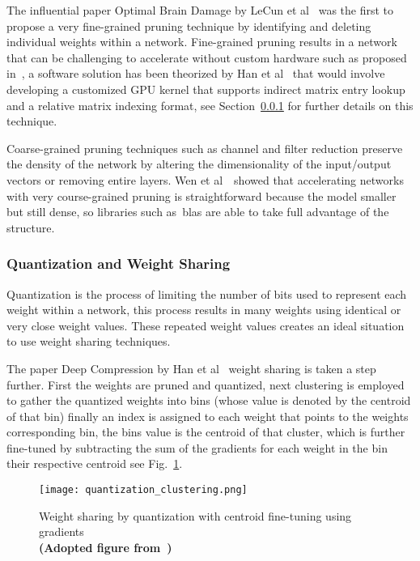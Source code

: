 \documentclass[../../D1.tex]{subfiles}
\begin{document}
The influential paper Optimal Brain Damage by LeCun et al~\autocite{lecunOptimalBrainDamage} was the first to propose a very fine-grained pruning technique by identifying and deleting individual weights within a network.
Fine-grained pruning results in a network that can be challenging to accelerate without custom hardware such as proposed in~\autocite{hanEIEEfficientInference2016,parasharSCNNAcceleratorCompressedsparse2017}, a software solution has been theorized by Han et al~\autocite{hanDeepCompressionCompressing2016} that would involve developing a customized GPU kernel that supports indirect matrix entry lookup and a relative matrix indexing format, see Section~\ref{sec:Quantization} for further details on this technique.


Coarse-grained pruning techniques such as channel and filter reduction preserve the density of the network by altering the dimensionality of the input/output vectors or removing entire layers. 
Wen et al~\autocite{wenLearningStructuredSparsity2016}~showed that accelerating networks with very course-grained pruning is straightforward because the model smaller but still dense, so libraries such as~\acrshort{blas} are able to take full advantage of the structure. 




\subsubsection{Quantization and Weight Sharing}\label{sec:Quantization}

Quantization is the process of limiting the number of bits used to represent each weight within a network, this process results in many weights using identical or very close weight values. 
These repeated weight values creates an ideal situation to use weight sharing techniques.

The paper Deep Compression by Han et al~\autocite{hanDeepCompressionCompressing2016} weight sharing is taken a step further.
First the weights are pruned and quantized, next clustering is employed to gather the quantized weights into bins (whose value is denoted by the centroid of that bin) finally an index is assigned to each weight that points to the weights corresponding bin, the bins value is the centroid of that cluster, which is further fine-tuned by subtracting the sum of the gradients for each weight in the bin their respective centroid see Fig.~\ref{fig:QuantizationClust}.  

\begin{figure}[H]
    \begin{center}
        \texttt{[image: quantization\_clustering.png]} 
    \end{center}
    
    \caption{Weight sharing by quantization with centroid fine-tuning using gradients\\ \textbf{(Adopted figure from~\autocite{hanDeepCompressionCompressing2016})}}
    \label{fig:QuantizationClust}   
\end{figure}
\end{document}
